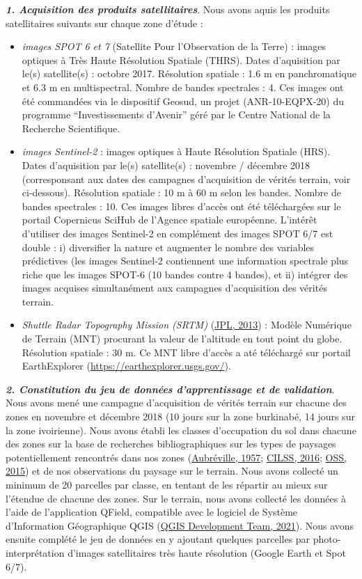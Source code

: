 \documentclass[12pt,twoside]{reedthesis}
\providecommand{\tightlist}{%
  \setlength{\itemsep}{0pt}\setlength{\parskip}{0pt}}
\begin{document}
\textbf{\emph{1. Acquisition des produits satellitaires}}. Nous avons aquis les produits satellitaires suivants sur chaque zone d'étude :
\begin{itemize}
\tightlist
\item
  \emph{images SPOT 6 et 7} (Satellite Pour l'Observation de la Terre) : images optiques à Très Haute Résolution Spatiale (THRS). Dates d'aquisition par le(s) satellite(s) : octobre 2017. Résolution spatiale : 1.6 m en panchromatique et 6.3 m en multispectral. Nombre de bandes spectrales : 4. Ces images ont été commandées via le dispositif Geosud, un projet (ANR-10-EQPX-20) du programme ``Investissements d'Avenir'' géré par le Centre National de la Recherche Scientifique.
\item
  \emph{images Sentinel-2} : images optiques à Haute Résolution Spatiale (HRS). Dates d'aquisition par le(s) satellite(s) : novembre / décembre 2018 (corresponsant aux dates des campagnes d'acquisition de vérités terrain, voir ci-dessous). Résolution spatiale : 10 m à 60 m selon les bandes. Nombre de bandes spectrales : 10. Ces images libres d'accès ont été téléchargées sur le portail Copernicus SciHub de l'Agence spatiale européenne. L'intérêt d'utiliser des images Sentinel-2 en complément des images SPOT 6/7 est double : i) diversifier la nature et augmenter le nombre des variables prédictives (les images Sentinel-2 contiennent une information spectrale plus riche que les images SPOT-6 (10 bandes contre 4 bandes), et ii) intégrer des images acquises simultanément aux campagnes d'acquisition des vérités terrain.
\item
  \emph{Shuttle Radar Topography Mission (SRTM)} (\protect\hyperlink{ref-nasa_jpl_nasa_2013}{JPL, 2013}) : Modèle Numérique de Terrain (MNT) procurant la valeur de l'altitude en tout point du globe. Résolution spatiale : 30 m. Ce MNT libre d'accès a até téléchargé sur portail EarthExplorer (\url{https://earthexplorer.usgs.gov/}).
\end{itemize}
\textbf{\emph{2. Constitution du jeu de données d'apprentissage et de validation}}. Nous avons mené une campagne d'acquisition de vérités terrain sur chacune des zones en novembre et décembre 2018 (10 jours sur la zone burkinabé, 14 jours sur la zone ivoirienne). Nous avons établi les classes d'occupation du sol dans chacune des zones sur la base de recherches bibliographiques sur les types de paysages potentiellement rencontrés dans nos zones (\protect\hyperlink{ref-aubreville_accord_1957}{Aubréville, 1957}; \protect\hyperlink{ref-cilss_2016_landscapes_nodate}{CILSS, 2016}; \protect\hyperlink{ref-oss_landcover_bf}{OSS, 2015}) et de nos observations du paysage sur le terrain. Nous avons collecté un minimum de 20 parcelles par classe, en tentant de les répartir au mieux sur l'étendue de chacune des zones. Sur le terrain, nous avons collecté les données à l'aide de l'application QField, compatible avec le logiciel de Système d'Information Géographique QGIS (\protect\hyperlink{ref-qgis_development_team_qgis_2021}{QGIS Development Team, 2021}). Nous avons ensuite complété le jeu de données en y ajoutant quelques parcelles par photo-interprétation d'images satellitaires très haute résolution (Google Earth et Spot 6/7).\\
\end{document}
